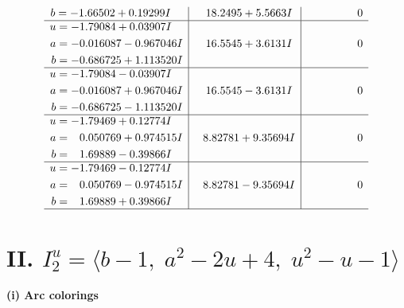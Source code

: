 \documentclass[1p]{elsarticle_modified}
\theoremstyle{definition}
\begin{document}
$$\begin{array}{c|c|c}
\begin{aligned}
b &= -1.66502 + 0.19299 I\end{aligned}
 & \phantom{-}18.2495 + 5.5663 I & \phantom{-0.000000 } 0 \\ \hline\begin{aligned}
u &= -1.79084 + 0.03907 I \\
a &= -0.016087 - 0.967046 I \\
b &= -0.686725 + 1.113520 I\end{aligned}
 & \phantom{-}16.5545 + 3.6131 I & \phantom{-0.000000 } 0 \\ \hline\begin{aligned}
u &= -1.79084 - 0.03907 I \\
a &= -0.016087 + 0.967046 I \\
b &= -0.686725 - 1.113520 I\end{aligned}
 & \phantom{-}16.5545 - 3.6131 I & \phantom{-0.000000 } 0 \\ \hline\begin{aligned}
u &= -1.79469 + 0.12774 I \\
a &= \phantom{-}0.050769 + 0.974515 I \\
b &= \phantom{-}1.69889 - 0.39866 I\end{aligned}
 & \phantom{-}8.82781 + 9.35694 I & \phantom{-0.000000 } 0 \\ \hline\begin{aligned}
u &= -1.79469 - 0.12774 I \\
a &= \phantom{-}0.050769 - 0.974515 I \\
b &= \phantom{-}1.69889 + 0.39866 I\end{aligned}
 & \phantom{-}8.82781 - 9.35694 I & \phantom{-0.000000 } 0\\
 \hline 
 \end{array}$$\newpage\newpage\renewcommand{\arraystretch}{1}
\centering \section*{II. $I^u_{2}= \langle b-1,\;a^2-2 u+4,\;u^2- u-1 \rangle$}
\flushleft \textbf{(i) Arc colorings}\\
\end{document}
